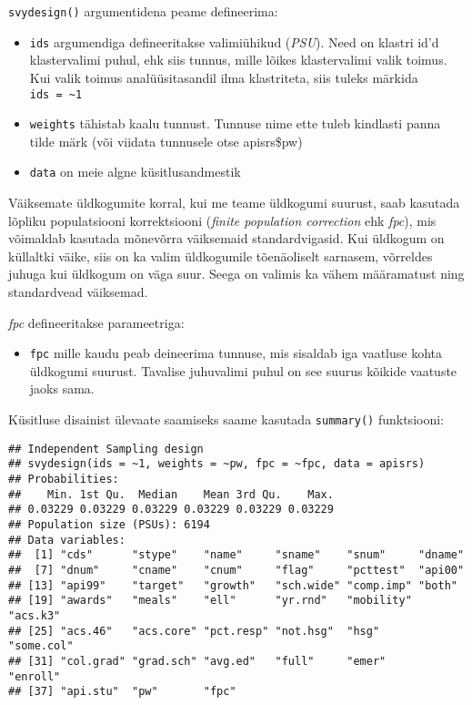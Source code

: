 \documentclass[
]{book}
\providecommand{\tightlist}{%
  \setlength{\itemsep}{0pt}\setlength{\parskip}{0pt}}
\begin{document}
\texttt{svydesign()} argumentidena peame defineerima:

\begin{itemize}
\tightlist
\item
  \texttt{ids} argumendiga defineeritakse valimiühikud (\emph{PSU}). Need on klastri id'd klastervalimi puhul, ehk siis tunnus, mille lõikes klastervalimi valik toimus. Kui valik toimus analüüsitasandil ilma klastriteta, siis tuleks märkida \texttt{ids\ =\ \textasciitilde{}1}
\item
  \texttt{weights} tähistab kaalu tunnust. Tunnuse nime ette tuleb kindlasti panna tilde märk (või viidata tunnusele otse apisrs\$pw)
\item
  \texttt{data} on meie algne küsitlusandmestik
\end{itemize}

Väiksemate üldkogumite korral, kui me teame üldkogumi suurust, saab kasutada lõpliku populatsiooni korrektsiooni (\emph{finite population correction} ehk \emph{fpc}), mis võimaldab kasutada mõnevõrra väiksemaid standardvigasid. Kui üldkogum on küllaltki väike, siis on ka valim üldkogumile tõenäoliselt sarnasem, võrreldes juhuga kui üldkogum on väga suur. Seega on valimis ka vähem määramatust ning standardvead väiksemad.

\emph{fpc} defineeritakse parameetriga:

\begin{itemize}
\tightlist
\item
  \texttt{fpc} mille kaudu peab deineerima tunnuse, mis sisaldab iga vaatluse kohta üldkogumi suurust. Tavalise juhuvalimi puhul on see suurus kõikide vaatuste jaoks sama.
\end{itemize}

Küsitluse disainist ülevaate saamiseks saame kasutada \texttt{summary()} funktsiooni:

\begin{verbatim}
## Independent Sampling design
## svydesign(ids = ~1, weights = ~pw, fpc = ~fpc, data = apisrs)
## Probabilities:
##    Min. 1st Qu.  Median    Mean 3rd Qu.    Max. 
## 0.03229 0.03229 0.03229 0.03229 0.03229 0.03229 
## Population size (PSUs): 6194 
## Data variables:
##  [1] "cds"      "stype"    "name"     "sname"    "snum"     "dname"   
##  [7] "dnum"     "cname"    "cnum"     "flag"     "pcttest"  "api00"   
## [13] "api99"    "target"   "growth"   "sch.wide" "comp.imp" "both"    
## [19] "awards"   "meals"    "ell"      "yr.rnd"   "mobility" "acs.k3"  
## [25] "acs.46"   "acs.core" "pct.resp" "not.hsg"  "hsg"      "some.col"
## [31] "col.grad" "grad.sch" "avg.ed"   "full"     "emer"     "enroll"  
## [37] "api.stu"  "pw"       "fpc"
\end{verbatim}
\end{document}
